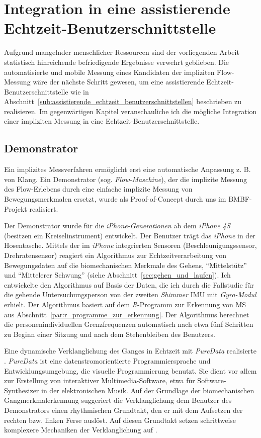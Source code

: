 \chapter{Integration in eine assistierende Echtzeit-Benutzerschnittstelle}
\label{cha:integration_in_eine_assistierende_echtzeit_benutzerschnittstelle}
Aufgrund mangelnder menschlicher Ressourcen sind der vorliegenden Arbeit statistisch hinreichende befriedigende Ergebnisse verwehrt geblieben. Die automatisierte und mobile Messung eines Kandidaten der impliziten Flow-Messung wäre der nächste Schritt gewesen, um eine assistierende Echtzeit-Benutzerschnittstelle wie in Abschnitt~\ref{sub:assistierende_echtzeit_benutzerschnittstellen} beschrieben zu realisieren. Im gegenwärtigen Kapitel veranschauliche ich die mögliche Integration einer impliziten Messung in eine Echtzeit-Benutzerschnittstelle.

\section{Demonstrator}
\label{sec:demonstrator}
Ein implizites Messverfahren ermöglicht erst eine automatische Anpassung z. B. von Klang. Ein Demonstrator (sog. \emph{Flow-Maschine}), der die implizite Messung des Flow-Erlebens durch eine einfache implizite Messung von Bewegungsmerkmalen ersetzt, wurde als Proof-of-Concept durch uns im \acs{BMBF}-Projekt realisiert.

Der Demonstrator wurde für die \emph{iPhone-Generationen} ab dem \emph{iPhone 4S} (besitzen ein Kreiselinstrument) entwickelt. Der Benutzer trägt das \emph{iPhone} in der Hosentasche. Mittels der im \emph{iPhone} integrierten Sensoren (Beschleunigungssensor, Drehratensensor) reagiert ein Algorithmus zur Echtzeitverarbeitung von Bewegungsdaten auf die biomechanischen Merkmale des Gehens, "`Mittelstütz"' und "`Mittelerer Schwung"' (siehe Abschnitt~\ref{sec:gehen_und_laufen}). Ich entwickelte den Algorithmus auf Basis der Daten, die ich durch die Fallstudie für die gehende Untersuchungsperson von der zweiten \emph{Shimmer} \ac{IMU} mit \emph{Gyro-Modul} erhielt. Der Algorithmus basiert auf dem \emph{R}-Programm zur Erkennung von MS aus Abschnitt~\ref{par:r_programme_zur_erkennung}. Der Algorithmus berechnet die personenindividuellen Grenzfrequenzen automatisch nach etwa fünf Schritten zu Beginn einer Sitzung und nach dem Stehenbleiben des Benutzers.

Eine dynamische Verklanglichung des Ganges in Echtzeit mit \emph{PureData} realisierte \citet{Hajinejad}. \emph{PureData} ist eine datenstromorientierte Programmiersprache und Entwicklungsumgebung, die visuelle Programmierung benutzt. Sie dient vor allem zur Erstellung von interaktiver Multimedia-Software, etwa für Software-Synthesizer in der elektronischen Musik. Auf der Grundlage der biomechanischen Gangmerkmalerkennung suggeriert die Verklanglichung dem Benutzer des Demonstrators einen rhythmischen Grundtakt, den er mit dem Aufsetzen der rechten bzw. linken Ferse auslöst. Auf diesen Grundtakt setzen schrittweise komplexere Mechaniken der Verklanglichung auf \citep[vgl.][]{Hajinejad}.

